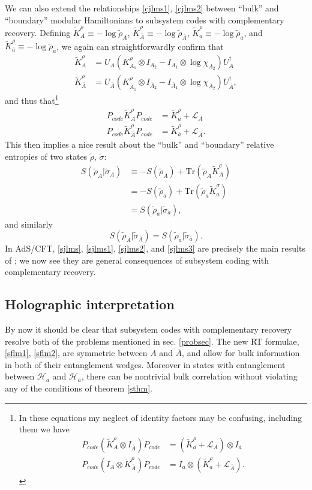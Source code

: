 \documentclass[12pt]{article}
\newcommand{\be}{\begin{equation}}
\newcommand{\ee}{\end{equation}}
\newcommand{\Tr}{\mathrm{Tr}}
\newcommand{\wt}{\widetilde}
\newcommand{\Ll}{\mathcal{L}}
\newcommand{\Ab}{\ol{A}}
\newcommand{\ab}{\ol{a}}
\newcommand{\Ha}{\mathcal{H}_{a}}
\newcommand{\Hab}{\mathcal{H}_{\ol{a}}}
\newcommand{\ol}{\overline}
\newcommand{\Pc}{P_{code}}
\begin{document}
We can also extend the relationships \eqref{cjlms1}, \eqref{cjlms2} between ``bulk'' and ``boundary'' modular Hamiltonians to subsystem codes with complementary recovery.  Defining $\wt{K}^\rho_A\equiv -\log \wt{\rho}_A$, $\wt{K}^\rho_{\Ab}\equiv -\log \wt{\rho}_{\Ab}$, $\wt{K}^\rho_a\equiv -\log \wt{\rho}_a$, and $\wt{K}^\rho_{\ab}\equiv -\log \wt{\rho}_{\ab}$, we again can straightforwardly confirm that
\begin{align}
\wt{K}^\rho_A&=U_A\left(K^\rho_{A_1}\otimes I_{A_2}-I_{A_1}\otimes \log \chi_{A_2}\right)U_A^\dagger\\
\wt{K}^\rho_{\Ab}&=U_{\Ab}\left(K^\rho_{\Ab_1}\otimes I_{\Ab_2}-I_{\Ab_1}\otimes \log \chi_{\Ab_2}\right)U_{\Ab}^\dagger,
\end{align}
and thus that\footnote{In these equations my neglect of identity factors may be confusing, including them we have
\begin{align}\nonumber
\Pc \left(\wt{K}^\rho_A\otimes I_{\Ab}\right) \Pc&=\left(\wt{K}^\rho_a+\Ll_A\right)\otimes I_{\ab}\\\nonumber
\Pc \left(I_A\otimes \wt{K}^\rho_{\Ab}\right) \Pc&=I_a\otimes \left(\wt{K}^\rho_{\ab}+\Ll_{\Ab}\right).
\end{align}}
\begin{align}\label{sjlms}
\Pc \wt{K}^\rho_A \Pc&=\wt{K}^\rho_a+\Ll_A\\\label{sjlms1}
\Pc \wt{K}^\rho_{\Ab} \Pc&=\wt{K}^\rho_{\ab}+\Ll_{\Ab}.
\end{align}
This then implies a nice result about the ``bulk'' and ``boundary'' relative entropies of two states $\wt{\rho}$, $\wt{\sigma}$:
\begin{align}\nonumber
S(\wt{\rho}_A|\wt{\sigma}_A)&\equiv -S(\wt{\rho}_A)+\Tr(\wt{\rho}_A \wt{K}^{\sigma}_A)\\\nonumber
&=-S(\wt{\rho}_a)+\Tr(\wt{\rho}_a \wt{K}^\sigma_a)\\
&=S(\wt{\rho}_a|\wt{\sigma}_a),\label{sjlms2}
\end{align}
and similarly 
\be\label{sjlms3}
S(\wt{\rho}_{\Ab}|\wt{\sigma}_{\Ab})=S(\wt{\rho}_a|\wt{\sigma}_{\ab}).
\ee  
In AdS/CFT, \eqref{sjlms}, \eqref{sjlms1}, \eqref{sjlms2}, and \eqref{sjlms3} are precisely the main results of \cite{Jafferis:2015del}; we now see they are general consequences of subsystem coding with complementary recovery.

\subsection{Holographic interpretation}
By now it should be clear that subsystem codes with complementary recovery resolve both of the problems mentioned in sec. \ref{probsec}. The new RT formulae, \eqref{sflm1}, \eqref{sflm2}, are symmetric between $A$ and $\Ab$, and allow for bulk information in both of their entanglement wedges.  Moreover in states with entanglement between $\Ha$ and $\Hab$, there can be nontrivial bulk correlation without violating any of the conditions of theorem \ref{sthm}.
\end{document}
